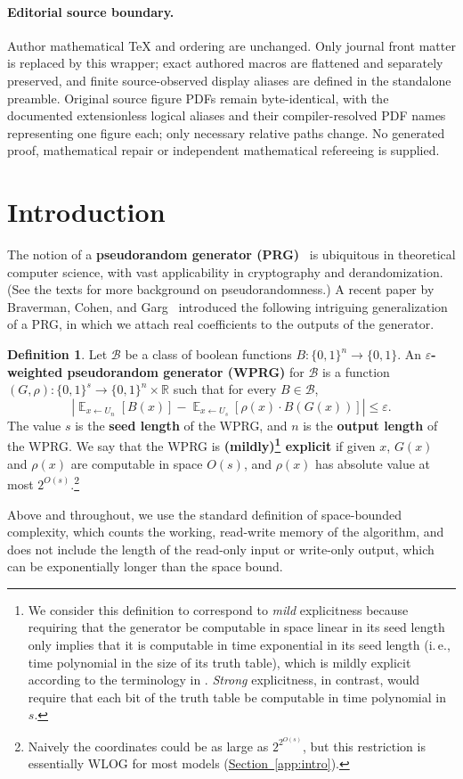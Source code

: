 \documentclass[11pt]{article}
\numberwithin{equation}{section}
\theoremstyle{definition}
\newtheorem{definition}[theorem]{Definition}
\theoremstyle{plain}
\newcommand{\R}{\mathbb R}
\newcommand{\ie}{i.\,e.}
\newcommand{\expref}[2]{\hyperref[#2]{#1~\ref{#2}}}
\newcommand{\eps}{\varepsilon}
\newcommand{\zo}{\{0,1\}}
\newcommand{\la}{\leftarrow}
\DeclareMathOperator*{\E}{\mathbb{E}}
\begin{document}
\paragraph{Editorial source boundary.}
Author mathematical TeX and ordering are unchanged. Only journal front matter is replaced by this wrapper; exact authored macros are flattened and separately preserved, and finite source-observed display aliases are defined in the standalone preamble. Original source figure PDFs remain byte-identical, with the documented extensionless logical aliases and their compiler-resolved PDF names representing one figure each; only necessary relative paths change. No generated proof, mathematical repair or independent mathematical refereeing is supplied. 
\clearpage

%
%
\section{Introduction}

The notion of a \textbf{pseudorandom generator (PRG)}~\cite{BlumMi84,Yao82,Nisan91,NisanWi94} is ubiquitous in theoretical computer science, with vast applicability in cryptography and derandomization.  (See the texts \cite{Goldreich10-prgprimer,vadhan2012pseudorandomness} for more background on pseudorandomness.)
A recent %
paper by %
Braverman, Cohen, and Garg~\cite{BravermanCoGa18} introduced the following intriguing generalization of a PRG, in which we attach real coefficients to the outputs of the generator. %

\begin{definition}\label{def:booleanWPRG}
	Let $\mathcal{B}$ be a class of boolean functions $B \colon \zo^n \to \{0, 1\}$. An \textbf{$\eps$-weighted pseudorandom generator (WPRG)} for $\mathcal{B}$ is a function $(G,\rho) \colon \zo^s \to \zo^n\times \R$ such that for every $B \in \mathcal{B}$,
	$$
		\left |\E_{x \la U_n}[B(x)] - \E_{x \la U_{s}}[\rho(x)\cdot B(G(x))]\right | \leq \eps.
	$$
	The value $s$ is the \textbf{seed length} of the WPRG, and $n$ is the \textbf{output length} of the WPRG. 
	We say that the WPRG is \textbf{(mildly)\footnote{We consider this definition to correspond to \emph{mild} explicitness because requiring that
	the generator be computable in space linear in its seed length only implies that it is computable in time exponential in its seed length (\ie, time polynomial in the size of its truth table), which is
	mildly explicit according to the terminology in \cite{vadhan2012pseudorandomness}.  \emph{Strong} explicitness, in contrast,
	would require that each bit of the truth table %
be %
computable in 
	time polynomial in $s$.} explicit} if given $x$, $G(x)$ and $\rho(x)$ are computable in space $O(s)$, and $\rho(x)$ 
	has absolute value at most $2^{O(s)}$.\footnote{Naively the coordinates could be as large as $2^{2^{O(s)}}$, but this restriction is essentially WLOG for most models (\expref{Section}{app:intro}).}  %
\end{definition}
Above and throughout, we use the standard definition of space-bounded complexity, which counts the working, read-write memory of the algorithm, and does not include the length of the read-only input or write-only output, which can be exponentially longer than the space bound.
\end{document}
